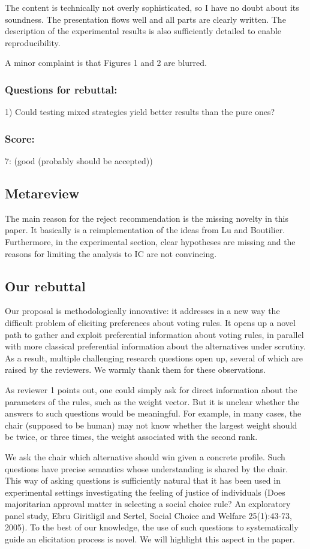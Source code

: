 \documentclass[version=3.21, pagesize, twoside=off, bibliography=totoc, DIV=calc, fontsize=12pt, a4paper]{scrartcl}
\begin{document}
The content is technically not overly sophisticated, so I have no doubt about its soundness.
The presentation flows well and all parts are clearly written. The description of the experimental results is also sufficiently detailed to enable reproducibility.

A minor complaint is that Figures 1 and 2 are blurred.
\subsubsection*{Questions for rebuttal:}
1) Could testing mixed strategies yield better results than the pure ones?
\subsubsection*{Score:}	
7: (good (probably should be accepted))

\subsection{Metareview}
The main reason for the reject recommendation is the missing novelty in this paper. It basically is a reimplementation of the ideas from Lu and Boutilier. Furthermore, in the experimental section, clear hypotheses are missing and the reasons for limiting the analysis to IC are not convincing.

\subsection{Our rebuttal}
Our proposal is methodologically innovative: it addresses in a new way the difficult problem of eliciting preferences about voting rules. It opens up a novel path to gather and exploit preferential information about voting rules, in parallel with more classical preferential information about the alternatives under scrutiny. As a result, multiple challenging research questions open up, several of which are raised by the reviewers. We warmly thank them for these observations.

As reviewer 1 points out, one could simply ask for direct information about the parameters of the rules, such as the weight vector. But it is unclear whether the answers to such questions would be meaningful. For example, in many cases, the chair (supposed to be human) may not know whether the largest weight should be twice, or three times, the weight associated with the second rank.

We ask the chair which alternative should win given a concrete profile. Such questions have precise semantics whose understanding is shared by the chair. This way of asking questions is sufficiently natural that it has been used in experimental settings investigating the feeling of justice of individuals (Does majoritarian approval matter in selecting a social choice rule? An exploratory panel study, Ebru Giritligil and Sertel, Social Choice and Welfare 25(1):43-73, 2005). To the best of our knowledge, the use of such questions to systematically guide an elicitation process is novel. We will highlight this aspect in the paper.
\end{document}

